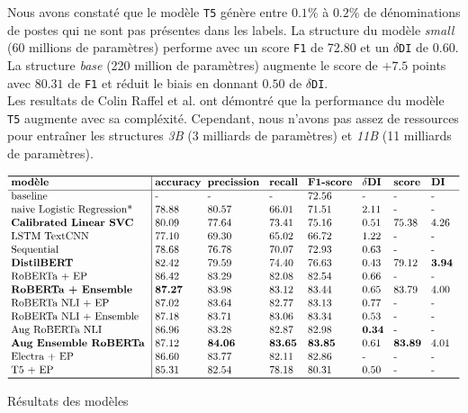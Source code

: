 Nous avons constaté que le modèle \texttt{T5} génère entre $0.1\%$ à $0.2\%$ de dénominations de postes qui ne sont pas présentes dans les labels. La structure du modèle \textit{small} (60 millions de paramètres) performe avec un score \texttt{F1} de 72.80 et un $\delta$\texttt{DI} de 0.60. La structure \textit{base} (220 million de paramètres) augmente le score de $+7.5$ points avec $80.31$ de \texttt{F1} et réduit le biais en donnant $0.50$ de $\delta$\texttt{DI}.\\
Les resultats de Colin Raffel et al. ont démontré que la performance du modèle \texttt{T5} augmente avec sa compléxité. Cependant, nous n'avons pas assez de ressources pour entraîner les structures \textit{3B} (3 milliards de paramètres) et \textit{11B} (11 milliards de paramètres).
\hfill\\

\begin{table}[ht!]
$$\vbox{
\offinterlineskip
\halign{
\strut
\vrule height1ex depth1ex width0px #
&\kern3pt #\hfil\kern3pt\vrule
&\kern3pt #\hfil\kern3pt
&\kern3pt #\hfil\kern3pt
&\kern3pt #\hfil\kern3pt
&\kern3pt #\hfil\kern3pt
&\kern3pt #\hfil\kern3pt
&\kern3pt #\hfil\kern3pt
&\kern3pt #\hfil\kern3pt
\cr
\noalign{\hrule height0.8pt}
 & \textbf{modèle}            & \textbf{accuracy}& \textbf{precission} & \textbf{recall} & \textbf{F1-score} & $\delta$\textbf{DI} & \textbf{score}  & \textbf{DI}  \cr
\noalign{\hrule}
 & baseline                   & -        & -          & -      & 72.56    & -       & -   & -                       \cr
 & naive Logistic Regression* & 78.88    & 80.57      & 66.01  & 71.51    & 2.11    & -   & -                       \cr
 & \textbf{Calibrated Linear SVC}  & 80.09    & 77.64      & 73.41  & 75.16    & 0.51    & 75.38 & 4.26                  \cr
 & LSTM TextCNN               & 77.10    & 69.30      & 65.02  & 66.72    & 1.22    & -   & -                       \cr
 & Sequential                 & 78.68    & 76.78      & 70.07  & 72.93    & 0.63    & -   & -                       \cr
 & \textbf{DistilBERT}                 & 82.42    & 79.59      & 74.40  & 76.63    & 0.43    & 79.12 & \textbf{3.94}         \cr
 & RoBERTa + EP               & 86.42    & 83.29      & 82.08  & 82.54    & 0.66    & -   & -                       \cr
 & \textbf{RoBERTa + Ensemble}         & \textbf{87.27} & 83.98      & 83.12  & 83.44    & 0.65    & 83.79  & 4.00           \cr
 & RoBERTa NLI + EP           & 87.02    & 83.64      & 82.77  & 83.13    & 0.77    & -   & -                      \cr
 & RoBERTa NLI + Ensemble     & 87.18    & 83.71      & 83.06  & 83.34    & 0.53    & -   & -                       \cr
 & Aug RoBERTa NLI            & 86.96    & 83.28      & 82.87  & 82.98    & \textbf{0.34} & -  & -                           \cr
 & \textbf{Aug Ensemble RoBERTa}       & 87.12    & \textbf{84.06} & \textbf{83.65} & \textbf{83.85} & 0.61  & \textbf{83.89}    & 4.01    \cr
 & Electra + EP               & 86.60    & 83.77      & 82.11  & 82.86    & -       & -   & -                     \cr
 & T5 + EP                    & 85.31    & 82.54      & 78.18  & 80.31    & 0.50    & -   & -                     \cr
\noalign{\hrule height0.8pt}
}
}$$
\caption{Résultats des modèles}
\label{table:1}
\end{table}



